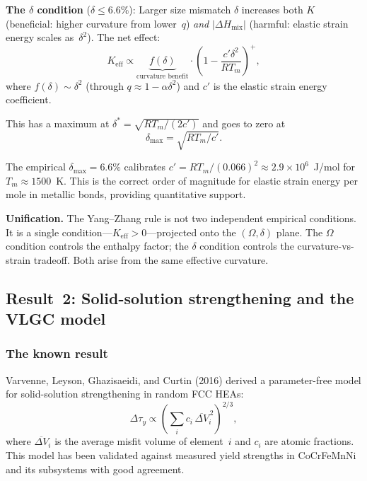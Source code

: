\documentclass[12pt,letterpaper]{article}
\theoremstyle{definition}
\begin{document}
\textbf{The $\delta$ condition} ($\delta \leq 6.6\%$): Larger size mismatch $\delta$ increases both $K$ (beneficial: higher curvature from lower~$q$) \emph{and} $|\Delta H_{\mathrm{mix}}|$ (harmful: elastic strain energy scales as~$\delta^2$).  The net effect:
\begin{equation}
  K_{\mathrm{eff}} \propto \underbrace{f(\delta)}_{\text{curvature benefit}} \cdot \left(1 - \frac{c' \delta^2}{RT_m}\right)^+,
\end{equation}
where $f(\delta) \sim \delta^2$ (through $q \approx 1 - \alpha\delta^2$) and $c'$ is the elastic strain energy coefficient.

This has a maximum at $\delta^* = \sqrt{RT_m / (2c')}$ and goes to zero at
\begin{equation}
  \delta_{\max} = \sqrt{RT_m / c'}.
\end{equation}

The empirical $\delta_{\max} = 6.6\%$ calibrates $c' = RT_m / (0.066)^2 \approx 2.9 \times 10^6$~J/mol for $T_m \approx 1500$~K.  This is the correct order of magnitude for elastic strain energy per mole in metallic bonds, providing quantitative support.

\begin{mdframed}
\textbf{Unification.}  The Yang--Zhang rule is not two independent empirical conditions.  It is a single condition---$K_{\mathrm{eff}} > 0$---projected onto the $(\Omega, \delta)$ plane.  The $\Omega$ condition controls the enthalpy factor; the $\delta$ condition controls the curvature-vs-strain tradeoff.  Both arise from the same effective curvature.
\end{mdframed}


\subsection{Result~2: Solid-solution strengthening and the VLGC model}

\subsubsection{The known result}

Varvenne, Leyson, Ghazisaeidi, and Curtin (2016) derived a parameter-free model for solid-solution strengthening in random FCC HEAs:
\begin{equation}\label{eq:VLGC}
  \Delta\tau_y \propto \left(\sum_i c_i \, \overline{\Delta V}_i^{\,2}\right)^{2/3},
\end{equation}
where $\overline{\Delta V}_i$ is the average misfit volume of element~$i$ and $c_i$ are atomic fractions.  This model has been validated against measured yield strengths in CoCrFeMnNi and its subsystems with good agreement.
\end{document}

